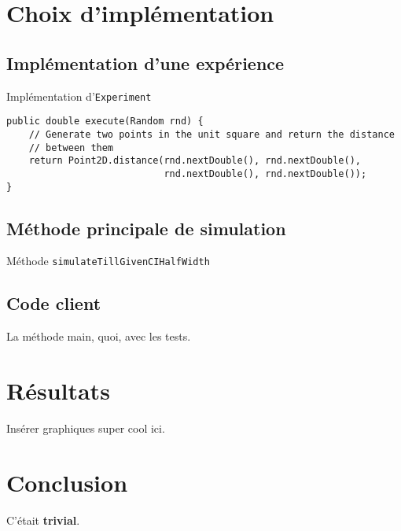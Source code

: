 \documentclass[paper=a4, fontsize=13pt]{scrartcl}
\begin{document}
\section{Choix d'implémentation}

\subsection{Implémentation d'une expérience}
Implémentation d'\texttt{Experiment}

\begin{lstlisting}[frame=single]
public double execute(Random rnd) {
    // Generate two points in the unit square and return the distance
    // between them
    return Point2D.distance(rnd.nextDouble(), rnd.nextDouble(),
                            rnd.nextDouble(), rnd.nextDouble());
}
\end{lstlisting}

\subsection{Méthode principale de simulation}
Méthode \texttt{simulateTillGivenCIHalfWidth}

\subsection{Code client}
La méthode main, quoi, avec les tests.

\section{Résultats}
Insérer graphiques super cool ici.

\section{Conclusion}
C'était \textbf{trivial}.
\end{document}
